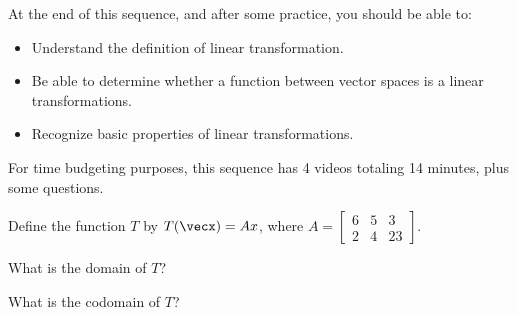 




At the end of this sequence, and after some practice, you should be able to:

\begin{itemize}
\item Understand the definition of linear transformation.  
\item Be able to determine whether a function between vector spaces is a linear transformations. 
\item Recognize basic properties of linear transformations.
\end{itemize}

For time budgeting purposes, this sequence has 4 videos totaling 14 minutes, 
plus some questions.  



\endedxtext

\endedxvertical







Define the function $T$ by $T(\vecx) = Ax$, where $A = \left[ \begin{array}{ccc}
6 & 5 & 3 \\
2 & 4 &  23 
\end{array} \right].$

What is the domain of $T$?


What is the codomain of $T$?



\endedxproblem



